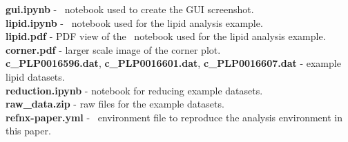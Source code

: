 \documentclass[pdf,preprint]{iucr}
\begin{document}
\noindent
\textbf{gui.ipynb} - \Jupyter\ notebook used to create the GUI screenshot.\\
\textbf{lipid.ipynb} - \Jupyter\ notebook used for the lipid analysis example.\\
\textbf{lipid.pdf} - PDF view of the \Jupyter\ notebook used for the lipid analysis example.\\
\textbf{corner.pdf} - larger scale image of the corner plot.\\
\textbf{c\_PLP0016596.dat}, \textbf{c\_PLP0016601.dat}, \textbf{c\_PLP0016607.dat} - example lipid datasets.\\
\textbf{reduction.ipynb} - notebook for reducing example datasets.\\
\textbf{raw\_data.zip} - raw files for the example datasets.\\
\textbf{refnx-paper.yml} - \conda\ environment file to reproduce the analysis environment in this paper.

{}

\end{document}
